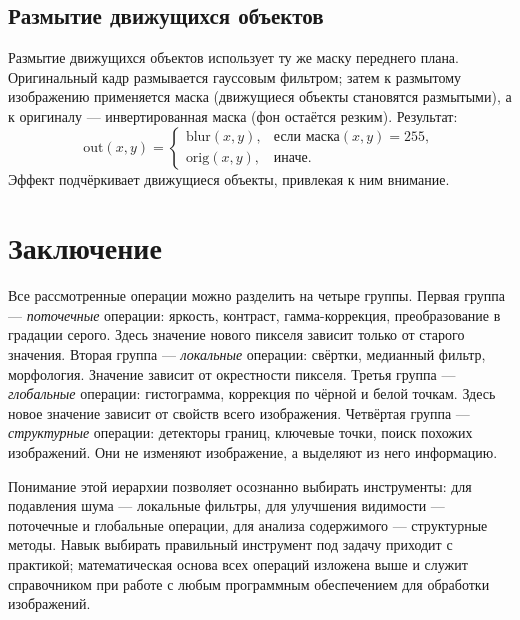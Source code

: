 \documentclass[a4paper,12pt]{article}
\begin{document}
\subsection{Размытие движущихся объектов}

Размытие движущихся объектов использует ту же маску переднего плана. Оригинальный кадр размывается гауссовым фильтром; затем к размытому изображению применяется маска (движущиеся объекты становятся размытыми), а к оригиналу --- инвертированная маска (фон остаётся резким). Результат:
\[
\text{out}(x, y) = \begin{cases}
\text{blur}(x, y), & \text{если маска}(x, y) = 255, \\
\text{orig}(x, y), & \text{иначе}.
\end{cases}
\]
Эффект подчёркивает движущиеся объекты, привлекая к ним внимание.

\section{Заключение}

Все рассмотренные операции можно разделить на четыре группы. Первая группа --- \emph{поточечные} операции: яркость, контраст, гамма-коррекция, преобразование в градации серого. Здесь значение нового пикселя зависит только от старого значения. Вторая группа --- \emph{локальные} операции: свёртки, медианный фильтр, морфология. Значение зависит от окрестности пикселя. Третья группа --- \emph{глобальные} операции: гистограмма, коррекция по чёрной и белой точкам. Здесь новое значение зависит от свойств всего изображения. Четвёртая группа --- \emph{структурные} операции: детекторы границ, ключевые точки, поиск похожих изображений. Они не изменяют изображение, а выделяют из него информацию.

Понимание этой иерархии позволяет осознанно выбирать инструменты: для подавления шума --- локальные фильтры, для улучшения видимости --- поточечные и глобальные операции, для анализа содержимого --- структурные методы. Навык выбирать правильный инструмент под задачу приходит с практикой; математическая основа всех операций изложена выше и служит справочником при работе с любым программным обеспечением для обработки изображений.
\end{document}
